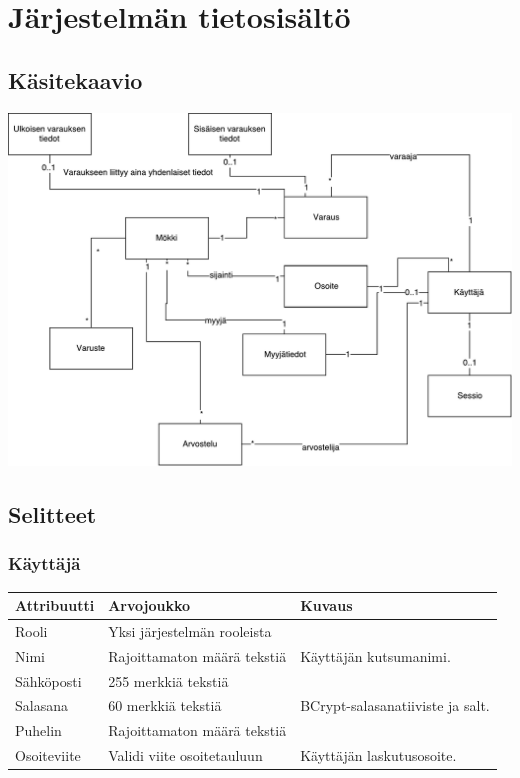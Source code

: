 \chapter{Järjestelmän tietosisältö}
\section{Käsitekaavio}

\includegraphics[width = 14cm]{./diagrams/drawio_entities.pdf}
\newpage
\section{Selitteet}

\subsection{Käyttäjä}
\begin{tabular}{|l|l|l|}
	\hline
	Attribuutti & Arvojoukko & Kuvaus \\ \hline
	Rooli & Yksi järjestelmän rooleista & \\ \hline
	Nimi & Rajoittamaton määrä tekstiä & Käyttäjän kutsumanimi. \\ \hline
	Sähköposti & 255 merkkiä tekstiä & \\ \hline
	Salasana & 60 merkkiä tekstiä & BCrypt-salasanatiiviste ja salt. \\ \hline
	Puhelin & Rajoittamaton määrä tekstiä & \\ \hline
	Osoiteviite & Validi viite osoitetauluun & Käyttäjän laskutusosoite. \\ \hline
\end{tabular}

